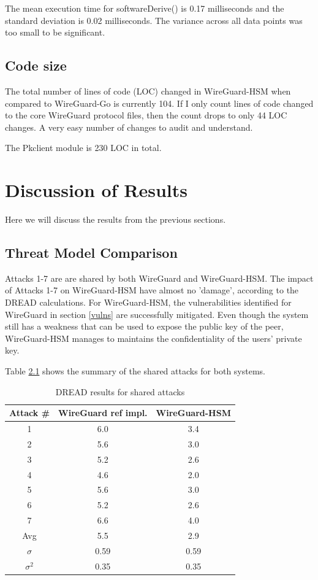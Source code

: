 \documentclass [11pt, proquest] {uwthesis}[2020/02/24]
\begin{document}
The mean execution time for softwareDerive() is 0.17 milliseconds and the standard deviation is 0.02 milliseconds. The variance across all data points was too small to be significant.

\section{Code size}
\label{loc}
The total number of lines of code (LOC) changed in WireGuard-HSM when compared to WireGuard-Go is currently 104. If I only count lines of code changed to the core WireGuard protocol files, then the count drops to only 44 LOC changes. A very easy number of changes to audit and understand.

The Pkclient module is 230 LOC in total.

\chapter {Discussion of Results}
Here we will discuss the results from the previous sections.

\section{Threat Model Comparison}
Attacks 1-7 are are shared by both WireGuard and WireGuard-HSM. The impact of Attacks 1-7 on WireGuard-HSM have almost no 'damage', according to the DREAD calculations. For WireGuard-HSM, the vulnerabilities identified for WireGuard in section \ref{vulns} are successfully mitigated. Even though the system still has a weakness that can be used to expose the public key of the peer, WireGuard-HSM manages to maintains the confidentiality of the users' private key.

Table \ref{tab:DREAD_AVG} shows the summary of the shared attacks for both systems.

\begin{table}[h!]
  \begin{center}
    \caption{DREAD results for shared attacks}
    \label{tab:DREAD_AVG}
    \begin{tabular}{c|c|c}
      \textbf{Attack \#} & \textbf{WireGuard ref impl.} & \textbf{WireGuard-HSM}\\
      \hline
      1 & 6.0 & 3.4\\
      2 & 5.6 & 3.0\\
      3 & 5.2 & 2.6\\
      4 & 4.6 & 2.0\\
      5 & 5.6 & 3.0\\
      6 & 5.2 & 2.6\\
      7 & 6.6 & 4.0\\
    \hline
    Avg & 5.5 & 2.9\\
    $\sigma$ &  0.59 & 0.59\\
    $\sigma^2$ &  0.35 & 0.35\\
    \end{tabular}
  \end{center}
\end{table}
\end{document}
